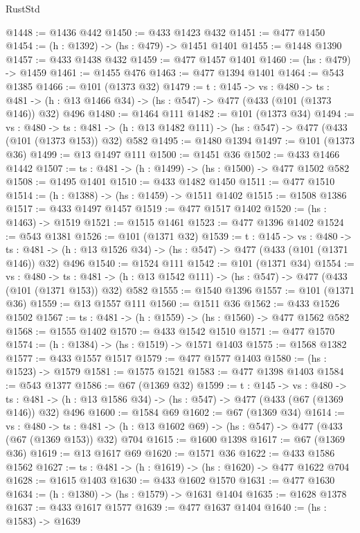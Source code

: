 \begin{lexlean}{RustStd}
\begin{coremodule}
@1448 := @1436 @442
@1450 := @433 @1423 @432
@1451 := @477 @1450
@1454 := (h : @1392) -> (hs : @479) -> @1451 @1401
@1455 := @1448 @1390
@1457 := @433 @1438 @432
@1459 := @477 @1457 @1401
@1460 := (hs : @479) -> @1459
@1461 := @1455 @476
@1463 := @477 @1394 @1401
@1464 := @543 @1385
@1466 := @101 (@1373 @32)
@1479 := {t : @145} ->
  {vs : @480} ->
  {ts : @481} -> (h : @13 @1466 @34) -> (hs : @547) -> @477 (@433 (@101 (@1373 @146)) @32) @496
@1480 := @1464 @111
@1482 := @101 (@1373 @34)
@1494 := {vs : @480} ->
  {ts : @481} -> (h : @13 @1482 @111) -> (hs : @547) -> @477 (@433 (@101 (@1373 @153)) @32) @582
@1495 := @1480 @1394
@1497 := @101 (@1373 @36)
@1499 := @13 @1497 @111
@1500 := @1451 @36
@1502 := @433 @1466 @1442
@1507 := {ts : @481} -> (h : @1499) -> (hs : @1500) -> @477 @1502 @582
@1508 := @1495 @1401
@1510 := @433 @1482 @1450
@1511 := @477 @1510
@1514 := (h : @1388) -> (hs : @1459) -> @1511 @1402
@1515 := @1508 @1386
@1517 := @433 @1497 @1457
@1519 := @477 @1517 @1402
@1520 := (hs : @1463) -> @1519
@1521 := @1515 @1461
@1523 := @477 @1396 @1402
@1524 := @543 @1381
@1526 := @101 (@1371 @32)
@1539 := {t : @145} ->
  {vs : @480} ->
  {ts : @481} -> (h : @13 @1526 @34) -> (hs : @547) -> @477 (@433 (@101 (@1371 @146)) @32) @496
@1540 := @1524 @111
@1542 := @101 (@1371 @34)
@1554 := {vs : @480} ->
  {ts : @481} -> (h : @13 @1542 @111) -> (hs : @547) -> @477 (@433 (@101 (@1371 @153)) @32) @582
@1555 := @1540 @1396
@1557 := @101 (@1371 @36)
@1559 := @13 @1557 @111
@1560 := @1511 @36
@1562 := @433 @1526 @1502
@1567 := {ts : @481} -> (h : @1559) -> (hs : @1560) -> @477 @1562 @582
@1568 := @1555 @1402
@1570 := @433 @1542 @1510
@1571 := @477 @1570
@1574 := (h : @1384) -> (hs : @1519) -> @1571 @1403
@1575 := @1568 @1382
@1577 := @433 @1557 @1517
@1579 := @477 @1577 @1403
@1580 := (hs : @1523) -> @1579
@1581 := @1575 @1521
@1583 := @477 @1398 @1403
@1584 := @543 @1377
@1586 := @67 (@1369 @32)
@1599 := {t : @145} ->
  {vs : @480} ->
  {ts : @481} -> (h : @13 @1586 @34) -> (hs : @547) -> @477 (@433 (@67 (@1369 @146)) @32) @496
@1600 := @1584 @69
@1602 := @67 (@1369 @34)
@1614 := {vs : @480} ->
  {ts : @481} -> (h : @13 @1602 @69) -> (hs : @547) -> @477 (@433 (@67 (@1369 @153)) @32) @704
@1615 := @1600 @1398
@1617 := @67 (@1369 @36)
@1619 := @13 @1617 @69
@1620 := @1571 @36
@1622 := @433 @1586 @1562
@1627 := {ts : @481} -> (h : @1619) -> (hs : @1620) -> @477 @1622 @704
@1628 := @1615 @1403
@1630 := @433 @1602 @1570
@1631 := @477 @1630
@1634 := (h : @1380) -> (hs : @1579) -> @1631 @1404
@1635 := @1628 @1378
@1637 := @433 @1617 @1577
@1639 := @477 @1637 @1404
@1640 := (hs : @1583) -> @1639

\end{coremodule}
\end{lexlean}
